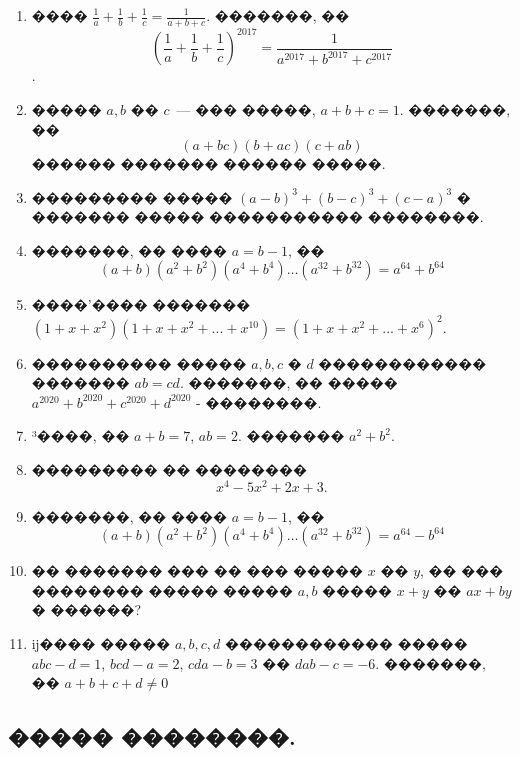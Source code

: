 \documentclass[a4paper,12pt]{article}
\begin{document}
\begin{enumerate}
\item ���� $\frac{1}{a}+\frac{1}{b}+\frac{1}{c}=\frac{1}{a+b+c}$. �������, �� $$(\frac{1}{a}+\frac{1}{b}+\frac{1}{c})^{2017}=\frac{1}{a^{2017}+b^{2017}+c^{2017}}$$.

\item ����� $a,b$ �� $c$~--- ��� �����, $a+b+c=1$. �������, �� $$(a+bc)(b+ac)(c+ab)$$ ������ ������� ������ �����.

\item ��������� ����� $(a-b)^{3}+(b-c)^{3}+(c-a)^{3}$ � ������� ����� ����������� ��������.

\item �������, �� ���� $a=b-1$, �� $$(a+b)(a^{2}+b^{2})(a^{4}+b^{4})\ldots (a^{32}+b^{32})=a^{64}+b^{64}$$


\item ����'���� ������� $(1+x+x^{2})(1+x+x^{2}+...+x^{10})=(1+x+x^{2}+...+x^{6})^{2}.$

\item ���������� ����� $a, b, c$ � $d$ ������������ ������� $ab=cd$. �������, �� ����� $a^{2020}+b^{2020}+c^{2020}+d^{2020}$ - ��������.

\item ³����, �� $a+b=7$, $ab=2$. ������� $a^{2}+b^{2}$.

\item ��������� �� �������� $$x^{4}-5x^{2}+2x+3.$$

\item �������, �� ���� $a=b-1$, �� $$(a+b)(a^{2}+b^{2})(a^{4}+b^{4})\ldots (a^{32}+b^{32})=a^{64}-b^{64}$$

\item �� ������� ��� �� ��� ����� $x$ �� $y$, �� ��� �������� ����� ����� $a,b$ ����� $x+y$ �� $ax+by$ � ������?

\item ĳ���� ����� $a,b,c,d$ ������������ ����� $abc-d=1$, $bcd-a=2$, $cda-b=3$ �� $dab-c=-6$. �������, �� $a+b+c+d\neq 0$
\end{enumerate}







\newpage

\begin{center}
\section*{����� ��������.}
\end{center}
\end{document}
